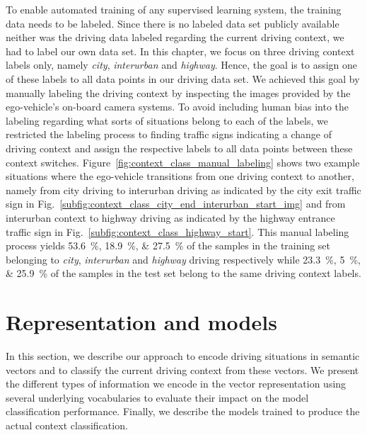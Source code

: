 To enable automated training of any supervised learning system, the training data needs to be labeled. 
Since there is no labeled data set publicly available neither was the driving data labeled regarding the current driving context, we had to label our own data set.
In this chapter, we focus on three driving context labels only, namely \emph{city}, \emph{interurban} and \emph{highway}.
Hence, the goal is to assign one of these labels to all data points in our driving data set.
We achieved this goal by manually labeling the driving context by inspecting the images provided by the ego-vehicle's on-board camera systems.
To avoid including human bias into the labeling regarding what sorts of situations belong to each of the labels, we restricted the labeling process to finding traffic signs indicating a change of driving context and assign the respective labels to all data points between these context switches.
Figure~\ref{fig:context_class_manual_labeling} shows two example situations where the ego-vehicle transitions from one driving context to another, namely from city driving to interurban driving as indicated by the city exit traffic sign in Fig.~\ref{subfig:context_class_city_end_interurban_start_img} and from interurban context to highway driving as indicated by the highway entrance traffic sign in Fig.~\ref{subfig:context_class_highway_start}.
This manual labeling process yields \SIlist{53.6;18.9;27.5}{\percent} of the samples in the training set belonging to \emph{city}, \emph{interurban} and \emph{highway} driving respectively while \SIlist{23.3;5;25.9}{\percent} of the samples in the test set belong to the same driving context labels.

\section{Representation and models}%
\label{sec:representation_and_modelsi_context_classification}

In this section, we describe our approach to encode driving situations in semantic vectors and to classify the current driving context from these vectors.
We present the different types of information we encode in the vector representation using several underlying vocabularies to evaluate their impact on the model classification performance.
Finally, we describe the models trained to produce the actual context classification.

